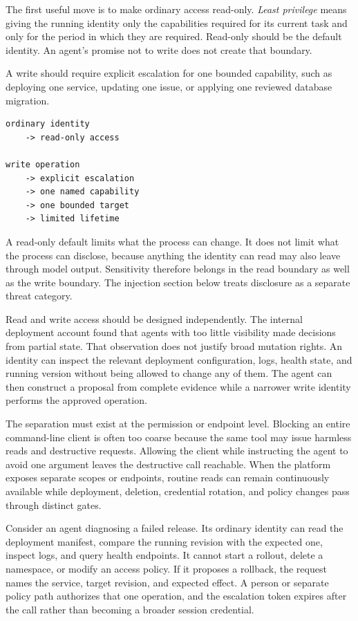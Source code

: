 The first useful move is to make ordinary access read-only. \emph{Least privilege} means giving the running identity only the capabilities required for its current task and only for the period in which they are required. Read-only should be the default identity. An agent's promise not to write does not create that boundary.

A write should require explicit escalation for one bounded capability, such as deploying one service, updating one issue, or applying one reviewed database migration.

\begin{verbatim}
ordinary identity
    -> read-only access

write operation
    -> explicit escalation
    -> one named capability
    -> one bounded target
    -> limited lifetime
\end{verbatim}

A read-only default limits what the process can change. It does not limit what the process can disclose, because anything the identity can read may also leave through model output. Sensitivity therefore belongs in the read boundary as well as the write boundary. The injection section below treats disclosure as a separate threat category.

Read and write access should be designed independently. The internal deployment account found that agents with too little visibility made decisions from partial state. That observation does not justify broad mutation rights. An identity can inspect the relevant deployment configuration, logs, health state, and running version without being allowed to change any of them. The agent can then construct a proposal from complete evidence while a narrower write identity performs the approved operation.

The separation must exist at the permission or endpoint level. Blocking an entire command-line client is often too coarse because the same tool may issue harmless reads and destructive requests. Allowing the client while instructing the agent to avoid one argument leaves the destructive call reachable. When the platform exposes separate scopes or endpoints, routine reads can remain continuously available while deployment, deletion, credential rotation, and policy changes pass through distinct gates.

Consider an agent diagnosing a failed release. Its ordinary identity can read the deployment manifest, compare the running revision with the expected one, inspect logs, and query health endpoints. It cannot start a rollout, delete a namespace, or modify an access policy. If it proposes a rollback, the request names the service, target revision, and expected effect. A person or separate policy path authorizes that one operation, and the escalation token expires after the call rather than becoming a broader session credential.


